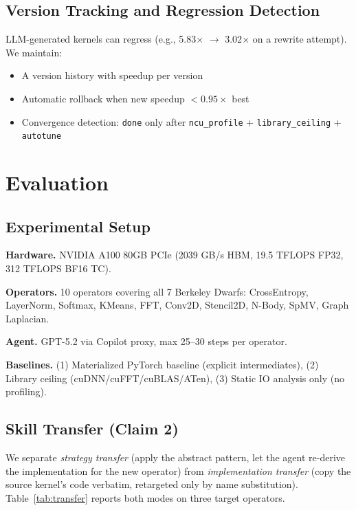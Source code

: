 \documentclass[sigconf,nonacm]{acmart}
\begin{document}
\subsection{Version Tracking and Regression Detection}

LLM-generated kernels can regress (e.g., 5.83$\times$ $\to$ 3.02$\times$ on a rewrite attempt). We maintain:
\begin{itemize}
    \item A version history with speedup per version
    \item Automatic rollback when new speedup $< 0.95 \times$ best
    \item Convergence detection: \texttt{done} only after \texttt{ncu\_profile} + \texttt{library\_ceiling} + \texttt{autotune}
\end{itemize}

\section{Evaluation}

\subsection{Experimental Setup}

\textbf{Hardware.} NVIDIA A100 80GB PCIe (2039 GB/s HBM, 19.5 TFLOPS FP32, 312 TFLOPS BF16 TC).

\textbf{Operators.} 10 operators covering all 7 Berkeley Dwarfs: CrossEntropy, LayerNorm, Softmax, KMeans, FFT, Conv2D, Stencil2D, N-Body, SpMV, Graph Laplacian.

\textbf{Agent.} GPT-5.2 via Copilot proxy, max 25--30 steps per operator.

\textbf{Baselines.} (1) Materialized PyTorch baseline (explicit intermediates), (2) Library ceiling (cuDNN/cuFFT/cuBLAS/ATen), (3) Static IO analysis only (no profiling).

\subsection{Skill Transfer (Claim 2)}

We separate \emph{strategy transfer} (apply the abstract pattern,
let the agent re-derive the implementation for the new operator)
from \emph{implementation transfer} (copy the source kernel's code
verbatim, retargeted only by name substitution).
Table~\ref{tab:transfer} reports both modes on three target
operators.
\end{document}
